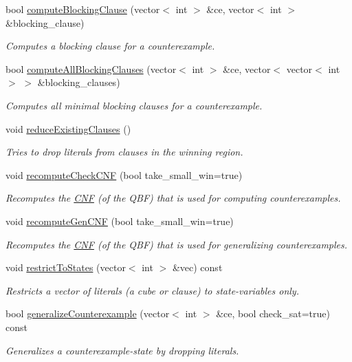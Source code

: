 \begin{DoxyCompactItemize}
bool \hyperlink{classLearnSynthQBF_a73856a79be3fb7e260485bcda7c31f80}{compute\-Blocking\-Clause} (vector$<$ int $>$ \&ce, vector$<$ int $>$ \&blocking\-\_\-clause)
\begin{DoxyCompactList}\small\item\em Computes a blocking clause for a counterexample. \end{DoxyCompactList}\item 
bool \hyperlink{classLearnSynthQBF_affa7b4583cc17d01f4c82fd57e763e1f}{compute\-All\-Blocking\-Clauses} (vector$<$ int $>$ \&ce, vector$<$ vector$<$ int $>$ $>$ \&blocking\-\_\-clauses)
\begin{DoxyCompactList}\small\item\em Computes all minimal blocking clauses for a counterexample. \end{DoxyCompactList}\item 
void \hyperlink{classLearnSynthQBF_adf5b9d45d6f69575ed5257fe9a869893}{reduce\-Existing\-Clauses} ()
\begin{DoxyCompactList}\small\item\em Tries to drop literals from clauses in the winning region. \end{DoxyCompactList}\item 
void \hyperlink{classLearnSynthQBF_aa46d02268fe5ea73789280058ec75136}{recompute\-Check\-C\-N\-F} (bool take\-\_\-small\-\_\-win=true)
\begin{DoxyCompactList}\small\item\em Recomputes the \hyperlink{classCNF}{C\-N\-F} (of the Q\-B\-F) that is used for computing counterexamples. \end{DoxyCompactList}\item 
void \hyperlink{classLearnSynthQBF_aa1c6d16c3db9057bfa515b06b7a7ffe9}{recompute\-Gen\-C\-N\-F} (bool take\-\_\-small\-\_\-win=true)
\begin{DoxyCompactList}\small\item\em Recomputes the \hyperlink{classCNF}{C\-N\-F} (of the Q\-B\-F) that is used for generalizing counterexamples. \end{DoxyCompactList}\item 
void \hyperlink{classLearnSynthQBF_a704edaade039b09520815b581fe98b47}{restrict\-To\-States} (vector$<$ int $>$ \&vec) const 
\begin{DoxyCompactList}\small\item\em Restricts a vector of literals (a cube or clause) to state-\/variables only. \end{DoxyCompactList}\item 
bool \hyperlink{classLearnSynthQBF_a9eed607741968f74e31976e8ca40a62f}{generalize\-Counterexample} (vector$<$ int $>$ \&ce, bool check\-\_\-sat=true) const 
\begin{DoxyCompactList}\small\item\em Generalizes a counterexample-\/state by dropping literals. \end{DoxyCompactList}\end{DoxyCompactItemize}
